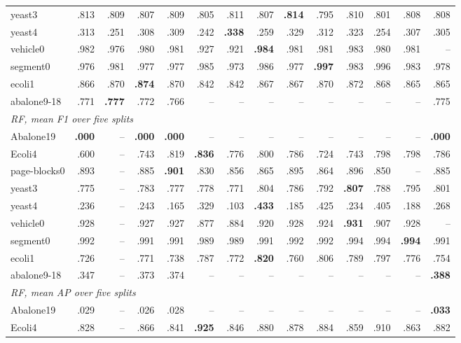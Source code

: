 \begin{table}[!t]
{\begin{tabular}{lrrrrrrrrrrrrr}
yeast3 & .813 & .809 & .807 & .809 & .805 & .811 & .807 & \textbf{.814} & .795 & .810 & .801 & .808 & .808 \\
yeast4 & .313 & .251 & .308 & .309 & .242 & \textbf{.338} & .259 & .329 & .312 & .323 & .254 & .307 & .305 \\
vehicle0 & .982 & .976 & .980 & .981 & .927 & .921 & \textbf{.984} & .981 & .981 & .983 & .980 & .981 & -- \\
segment0 & .976 & .981 & .977 & .977 & .985 & .973 & .986 & .977 & \textbf{.997} & .983 & .996 & .983 & .978 \\
ecoli1 & .866 & .870 & \textbf{.874} & .870 & .842 & .842 & .867 & .867 & .870 & .872 & .868 & .865 & .865 \\
abalone9-18 & .771 & \textbf{.777} & .772 & .766 & -- & -- & -- & -- & -- & -- & -- & -- & .775 \\
\midrule
\multicolumn{14}{l}{\textit{RF, mean F1 over five splits}} \\
Abalone19 & \textbf{.000} & -- & \textbf{.000} & \textbf{.000} & -- & -- & -- & -- & -- & -- & -- & -- & \textbf{.000} \\
Ecoli4 & .600 & -- & .743 & .819 & \textbf{.836} & .776 & .800 & .786 & .724 & .743 & .798 & .798 & .786 \\
page-blocks0 & .893 & -- & .885 & \textbf{.901} & .830 & .856 & .865 & .895 & .864 & .896 & .850 & -- & .885 \\
yeast3 & .775 & -- & .783 & .777 & .778 & .771 & .804 & .786 & .792 & \textbf{.807} & .788 & .795 & .801 \\
yeast4 & .236 & -- & .243 & .165 & .329 & .103 & \textbf{.433} & .185 & .425 & .234 & .405 & .188 & .268 \\
vehicle0 & .928 & -- & .927 & .927 & .877 & .884 & .920 & .928 & .924 & \textbf{.931} & .907 & .928 & -- \\
segment0 & .992 & -- & .991 & .991 & .989 & .989 & .991 & .992 & .992 & .994 & .994 & \textbf{.994} & .991 \\
ecoli1 & .726 & -- & .771 & .738 & .787 & .772 & \textbf{.820} & .760 & .806 & .789 & .797 & .776 & .754 \\
abalone9-18 & .347 & -- & .373 & .374 & -- & -- & -- & -- & -- & -- & -- & -- & \textbf{.388} \\
\midrule
\multicolumn{14}{l}{\textit{RF, mean AP over five splits}} \\
Abalone19 & .029 & -- & .026 & .028 & -- & -- & -- & -- & -- & -- & -- & -- & \textbf{.033} \\
Ecoli4 & .828 & -- & .866 & .841 & \textbf{.925} & .846 & .880 & .878 & .884 & .859 & .910 & .863 & .882 \\

\end{tabular}}
\end{table}
